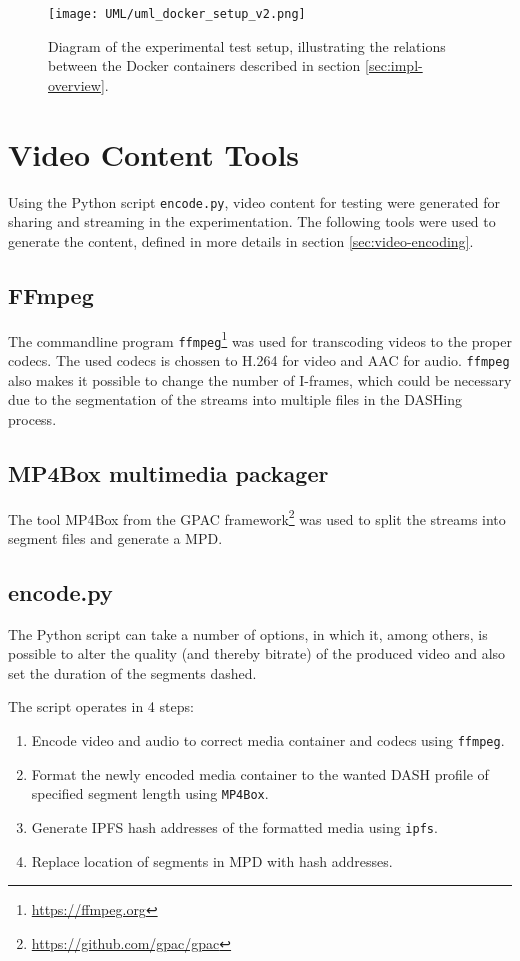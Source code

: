 \begin{figure}[bth]
       \texttt{[image: UML/uml\_docker\_setup\_v2.png]}
       \caption[Diagram of the experimental test  setup]{Diagram of the experimental test setup, illustrating the relations between the Docker containers described in section \ref{sec:impl-overview}.}
        \label{fig:uml_docker-compose}
\end{figure}

\section{Video Content Tools}
Using the Python script \texttt{encode.py}, video content for testing were generated for sharing and streaming in the experimentation. The following tools were used to generate the content, defined in more details in section \ref{sec:video-encoding}.

\subsection{FFmpeg}
The commandline program \texttt{ffmpeg}\footnote{\url{https://ffmpeg.org}} was used for transcoding videos to the proper codecs. The used codecs is chossen to H.264 for video and AAC for audio. 
\texttt{ffmpeg} also makes it possible to change the number of I-frames, which could be necessary due to the segmentation of the streams into multiple files in the DASHing process.

\subsection{MP4Box multimedia packager}
The tool MP4Box from the GPAC framework\footnote{\url{https://github.com/gpac/gpac}} was used to split the streams into segment files and generate a \acs{MPD}.

\subsection{encode.py}
The Python script can take a number of options, in which it, among others, is possible to alter the quality (and thereby bitrate) of the produced video and also set the duration of the segments dashed.

The script operates in 4 steps:
\begin{enumerate}
    \item Encode video and audio to correct media container and codecs using \texttt{ffmpeg}.
    \item Format the newly encoded media container to the wanted DASH profile of specified segment length using \texttt{MP4Box}.
    \item Generate \acs{IPFS} hash addresses of the formatted media using \texttt{ipfs}.
    \item Replace location of segments in \acs{MPD} with hash addresses.
\end{enumerate}

